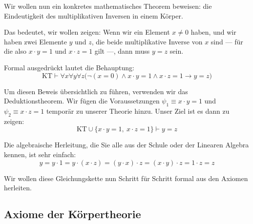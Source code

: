 \begin{spoken-clean}[01:08:42 - 01:11:42]
Wir wollen nun ein konkretes mathematisches Theorem beweisen: die Eindeutigkeit des multiplikativen Inversen in einem Körper. 

Das bedeutet, wir wollen zeigen: Wenn wir ein Element $x \neq 0$ haben, und wir haben zwei Elemente $y$ und $z$, die beide multiplikative Inverse von $x$ sind --- für die also $x \cdot y = 1$ und $x \cdot z = 1$ gilt ---, dann muss $y = z$ sein. 

Formal ausgedrückt lautet die Behauptung:
\[ \text{KT} \vdash \forall x \forall y \forall z \bigl(\neg(x = 0) \wedge x \cdot y = 1 \wedge x \cdot z = 1 \rightarrow y = z\bigr) \]

Um diesen Beweis übersichtlich zu führen, verwenden wir das Deduktionstheorem. Wir fügen die Voraussetzungen $\psi_1 \equiv x \cdot y = 1$ und $\psi_2 \equiv x \cdot z = 1$ temporär zu unserer Theorie hinzu. Unser Ziel ist es dann zu zeigen:
\[ \text{KT} \cup \{x \cdot y = 1, \ x \cdot z = 1\} \vdash y = z \]

Die algebraische Herleitung, die Sie alle aus der Schule oder der Linearen Algebra kennen, ist sehr einfach:
\[ y = y \cdot 1 = y \cdot (x \cdot z) = (y \cdot x) \cdot z = (x \cdot y) \cdot z = 1 \cdot z = z \]

Wir wollen diese Gleichungskette nun Schritt für Schritt formal aus den Axiomen herleiten.
\end{spoken-clean}

\subsection{Axiome der Körpertheorie}

\begin{math-stroke}
\end{math-stroke}



